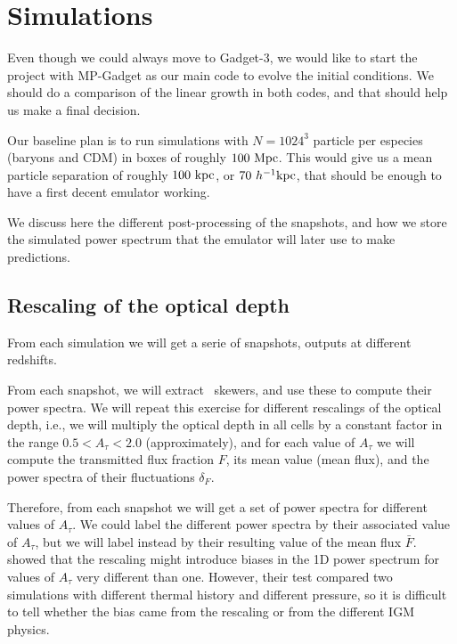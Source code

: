 \section{Simulations}
\label{sec:sims}

Even though we could always move to Gadget-3, we would like to start the 
project with MP-Gadget as our main code to evolve the initial conditions. 
We should do a comparison of the linear growth in both codes, and that should
help us make a final decision.

Our baseline plan is to run simulations with $N=1024^3$ particle per especies
(baryons and CDM) in boxes of roughly $100 \ \text{Mpc}$.
This would give us a mean particle separation of roughly $100 \ \text{kpc}$, or 
$70 \ h^{-1}\text{kpc}$, that should be enough to have a first decent emulator working.


We discuss here the different post-processing of the snapshots, and how we
store the simulated power spectrum that the emulator will later use to make
predictions.


\subsection{Rescaling of the optical depth}

From each simulation we will get a serie of snapshots, outputs at different
redshifts. 

From each snapshot, we will extract \lya\ skewers, and use these to compute
their power spectra.
We will repeat this exercise for different rescalings of the optical depth,
i.e., we will multiply the optical depth in all cells by a constant factor
in the range $0.5 < A_\tau < 2.0$ (approximately), and for each value of
$A_\tau$ we will compute the transmitted flux fraction $F$, its mean value
(mean flux), and the power spectra of their fluctuations $\delta_F$.

Therefore, from each snapshot we will get a set of power spectra for different
values of $A_\tau$.
We could label the different power spectra by their associated value of
$A_\tau$, but we will label instead by their resulting value of the mean
flux $\bar F$.
\cite{Lukic2015} showed that the rescaling might introduce biases in the
1D power spectrum for values of $A_\tau$ very different than one.
However, their test compared two simulations with different thermal history
and different pressure, so it is difficult to tell whether the bias came
from the rescaling or from the different IGM physics.


